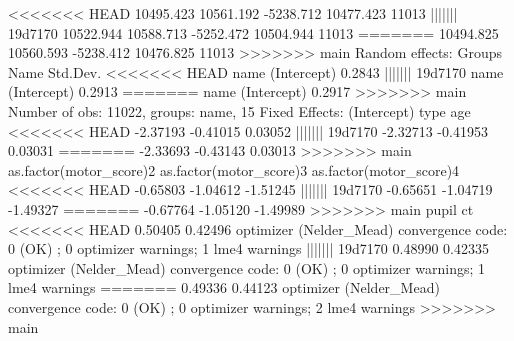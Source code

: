 \documentclass[
]{jss}
\begin{document}
\begin{CodeChunk}
\begin{CodeOutput}
<<<<<<< HEAD
10495.423 10561.192 -5238.712 10477.423     11013 
||||||| 19d7170
10522.944 10588.713 -5252.472 10504.944     11013 
=======
10494.825 10560.593 -5238.412 10476.825     11013 
>>>>>>> main
Random effects:
 Groups Name        Std.Dev.
<<<<<<< HEAD
 name   (Intercept) 0.2843  
||||||| 19d7170
 name   (Intercept) 0.2913  
=======
 name   (Intercept) 0.2917  
>>>>>>> main
Number of obs: 11022, groups:  name, 15
Fixed Effects:
            (Intercept)                     type                      age  
<<<<<<< HEAD
               -2.37193                 -0.41015                  0.03052  
||||||| 19d7170
               -2.32713                 -0.41953                  0.03031  
=======
               -2.33693                 -0.43143                  0.03013  
>>>>>>> main
as.factor(motor_score)2  as.factor(motor_score)3  as.factor(motor_score)4  
<<<<<<< HEAD
               -0.65803                 -1.04612                 -1.51245  
||||||| 19d7170
               -0.65651                 -1.04719                 -1.49327  
=======
               -0.67764                 -1.05120                 -1.49989  
>>>>>>> main
                  pupil                       ct  
<<<<<<< HEAD
                0.50405                  0.42496  
optimizer (Nelder_Mead) convergence code: 0 (OK) ; 0 optimizer warnings; 1 lme4 warnings 
||||||| 19d7170
                0.48990                  0.42335  
optimizer (Nelder_Mead) convergence code: 0 (OK) ; 0 optimizer warnings; 1 lme4 warnings 
=======
                0.49336                  0.44123  
optimizer (Nelder_Mead) convergence code: 0 (OK) ; 0 optimizer warnings; 2 lme4 warnings 
>>>>>>> main


\end{CodeOutput}
\end{CodeChunk}
\end{document}
